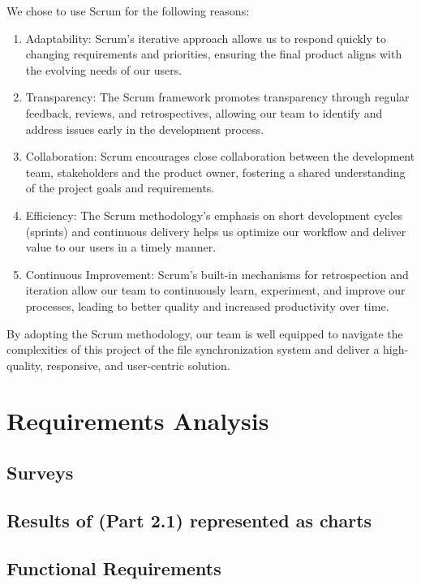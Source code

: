 \documentclass{article}
\begin{document}
        We chose to use Scrum for the following reasons:
        \begin{enumerate}
          \item Adaptability: Scrum's iterative approach allows us to respond quickly to changing requirements and priorities, ensuring the final product aligns with the evolving needs of our users.
          \item Transparency: The Scrum framework promotes transparency through regular feedback, reviews, and retrospectives, allowing our team to identify and address issues early in the development process.
          \item Collaboration: Scrum encourages close collaboration between the development team, stakeholders and the product owner, fostering a shared understanding of the project goals and requirements.
          \item Efficiency: The Scrum methodology's emphasis on short development cycles (sprints) and continuous delivery helps us optimize our workflow and deliver value to our users in a timely manner.
          \item Continuous Improvement: Scrum's built-in mechanisms for retrospection and iteration allow our team to continuously learn, experiment, and improve our processes, leading to better quality and increased productivity over time.
        \end{enumerate}
       By adopting the Scrum methodology, our team is well equipped to navigate the complexities of this project of the file synchronization system and deliver a high-quality, responsive, and user-centric solution.
        \section{Requirements Analysis}
                \subsection{Surveys}

                \subsection{Results of (Part 2.1) represented as charts}

                \subsection{Functional Requirements}    
                     
\end{document}
